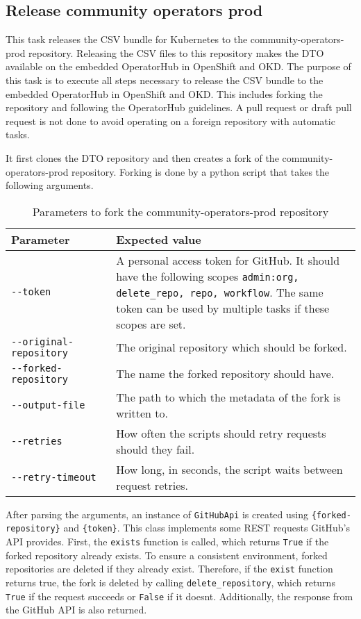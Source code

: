\subsection{Release community operators prod}\label{subsec:release-community-operators-prod}

This task releases the CSV bundle for Kubernetes to the community-operators-prod repository.
Releasing the CSV files to this repository makes the DTO available on the embedded OperatorHub in OpenShift and OKD.
The purpose of this task is to execute all steps necessary to release the CSV bundle to the embedded OperatorHub in OpenShift and OKD.
This includes forking the repository and following the OperatorHub guidelines.
A pull request or draft pull request is not done to avoid operating on a foreign repository with automatic tasks.


It first clones the DTO repository and then creates a fork of the community-operators-prod repository.
Forking is done by a python script that takes the following arguments.

\begin{table}
    \centering
    \caption{Parameters to fork the community-operators-prod repository}
    \label{tab:parameters-to-fork-the-community-operators-prod-repository}
    \begin{tabular}{|p{0.3\linewidth}|p{0.7\linewidth}|}
        Parameter & Expected value \\
        \hline
        \verb|--token| & A personal access token for GitHub.
            It should have the following scopes \verb|admin:org, delete_repo, repo, workflow|.
            The same token can be used by multiple tasks if these scopes are set. \\
        \verb|--original-repository| & The original repository which should be forked. \\
        \verb|--forked-repository| & The name the forked repository should have. \\
        \verb|--output-file| & The path to which the metadata of the fork is written to. \\
        \verb|--retries| & How often the scripts should retry requests should they fail. \\
        \verb|--retry-timeout| & How long, in seconds, the script waits between request retries. \\
    \end{tabular}
\end{table}

After parsing the arguments, an instance of \verb|GitHubApi| is created using \verb|{forked-repository}| and \verb|{token}|.
This class implements some REST requests GitHub's API provides.
First, the \verb|exists| function is called, which returns \verb|True| if the forked repository already exists.
To ensure a consistent environment, forked repositories are deleted if they already exist.
Therefore, if the \verb|exist| function returns true, the fork is deleted by calling \verb|delete_repository|, which returns \verb|True| if the request succeeds or \verb|False| if it doesnt.
Additionally, the response from the GitHub API is also returned.

